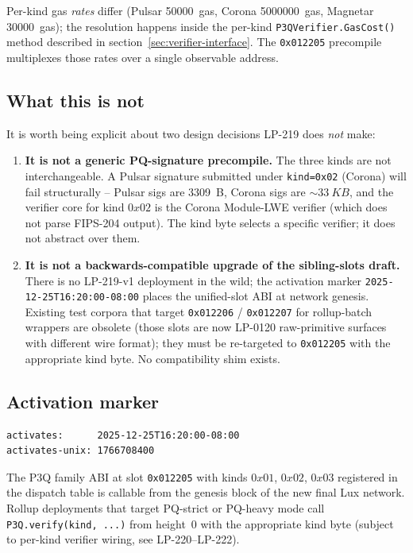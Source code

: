 Per-kind gas \emph{rates} differ (Pulsar \SI{50000}{gas}, Corona
\SI{5000000}{gas}, Magnetar \SI{30000}{gas}); the resolution
happens inside the per-kind \texttt{P3QVerifier.GasCost()} method
described in section~\ref{sec:verifier-interface}. The
\texttt{0x012205} precompile multiplexes those rates over a
single observable address.

\subsection{What this is not}

It is worth being explicit about two design decisions LP-219
does \emph{not} make:

\begin{enumerate}[leftmargin=2em,nosep]
\item \textbf{It is not a generic PQ-signature precompile.} The
  three kinds are not interchangeable. A Pulsar signature
  submitted under \texttt{kind=0x02} (Corona) will fail
  structurally -- Pulsar sigs are \SI{3309}{B}, Corona sigs are
  $\sim\SI{33}{KB}$, and the verifier core for kind $0x02$ is the
  Corona Module-LWE verifier (which does not parse FIPS-204
  output). The kind byte selects a specific verifier; it does
  not abstract over them.
\item \textbf{It is not a backwards-compatible upgrade of the
  sibling-slots draft.} There is no LP-219-v1 deployment in the
  wild; the activation marker
  \texttt{2025-12-25T16:20:00-08:00} places the unified-slot
  ABI at network genesis. Existing test corpora that target
  \texttt{0x012206} / \texttt{0x012207} for rollup-batch wrappers
  are obsolete (those slots are now LP-0120 raw-primitive
  surfaces with different wire format); they must be re-targeted
  to \texttt{0x012205} with the appropriate kind byte. No
  compatibility shim exists.
\end{enumerate}

\subsection{Activation marker}

\begin{verbatim}
activates:      2025-12-25T16:20:00-08:00
activates-unix: 1766708400
\end{verbatim}

The P3Q family ABI at slot \texttt{0x012205} with kinds $0x01$,
$0x02$, $0x03$ registered in the dispatch table is callable from
the genesis block of the new final Lux network. Rollup
deployments that target PQ-strict or PQ-heavy mode call
\texttt{P3Q.verify(kind, ...)} from height~0 with the appropriate
kind byte (subject to per-kind verifier wiring, see
LP-220--LP-222).
